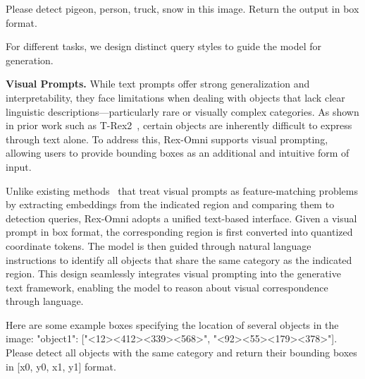 \begin{tcolorbox}[
  colback=lightblue!5,
  colframe=blue!20!black,
  coltitle=black,
  colbacktitle=lightblue!20,
  title=Example of a text prompt for multi-object detection,
  fonttitle=\bfseries,
  boxrule=1.0pt
]
Please detect pigeon, person, truck, snow in this image. Return the output in box format.
\end{tcolorbox}

\noindent For different tasks, we design distinct query styles to guide the model for generation.

\vspace{0.3em}
\noindent\textbf{Visual Prompts.}  
While text prompts offer strong generalization and interpretability, they face limitations when dealing with objects that lack clear linguistic descriptions—particularly rare or visually complex categories. As shown in prior work such as T-Rex2~\cite{jiang2025t}, certain objects are inherently difficult to express through text alone. To address this, Rex-Omni supports visual prompting, allowing users to provide bounding boxes as an additional and intuitive form of input.

Unlike existing methods~\cite{jiang2025t, ren2024dino, jiang2023t} that treat visual prompts as feature-matching problems by extracting embeddings from the indicated region and comparing them to detection queries, Rex-Omni adopts a unified text-based interface. Given a visual prompt in box format, the corresponding region is first converted into quantized coordinate tokens. The model is then guided through natural language instructions to identify all objects that share the same category as the indicated region. This design seamlessly integrates visual prompting into the generative text framework, enabling the model to reason about visual correspondence through language.

\begin{tcolorbox}[
colback=lightblue!5,
colframe=blue!20!black,
coltitle=black,
colbacktitle=lightblue!20,
title=An example of visual prompting in Rex-Omni,
fonttitle=\bfseries,
boxrule=1.0pt
]
Here are some example boxes specifying the location of several objects in the image:
{"object1": ["<12><412><339><568>", "<92><55><179><378>"]}.
Please detect all objects with the same category and return their bounding boxes in [x0, y0, x1, y1] format.
\end{tcolorbox}


